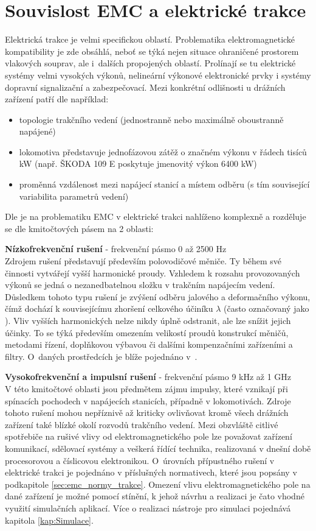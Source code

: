 \section{Souvislost EMC a elektrické trakce} \label{sec:emc_trakce}
Elektrická trakce je velmi specifickou oblastí. Problematika elektromagnetické kompatibility je zde obsáhlá, neboť se týká nejen situace ohraničené prostorem vlakových souprav, ale i~dalších propojených oblastí. Prolínají se tu elektrické systémy velmi vysokých výkonů, nelineární výkonové elektronické prvky i systémy dopravní signalizační a zabezpečovací. Mezi konkrétní odlišnosti u drážních zařízení patří dle \cite{nfr} například:
\begin{itemize}
\item topologie trakčního vedení (jednostranně nebo maximálně oboustranně napájené)
\item lokomotiva představuje jednofázovou zátěž o značném výkonu v řádech tisíců kW (např. ŠKODA 109 E poskytuje jmenovitý výkon 6400 kW)
\item proměnná vzdálenost mezi napájecí stanicí a místem odběru (s tím související variabilita parametrů vedení)
\end{itemize}
Dle \cite{emc_trakce} je na problematiku EMC v elektrické trakci nahlíženo komplexně a rozděluje se dle kmitočtových pásem na 2 oblasti:

\medskip
{\bf Nízkofrekvenční rušení} - frekvenční pásmo 0 až 2500 Hz \\
Zdrojem rušení představují především polovodičové měniče. Ty během své činnosti vytvářejí vyšší harmonické proudy. Vzhledem k rozsahu provozovaných výkonů se jedná o nezanedbatelnou složku v trakčním napájecím vedení. Důsledkem tohoto typu rušení je zvýšení odběru jalového a deformačního výkonu, čímž dochází k souvisejícímu zhoršení celkového účiníku $\lambda$ (často označovaný jako ). Vliv vyšších harmonických nelze nikdy úplně odstranit, ale lze snížit jejich účinky. To se týká především omezením velikostí proudů konstrukcí měničů, metodami řízení, doplňkovou výbavou či dalšími kompenzačními zařízeními a filtry. O~daných prostředcích je blíže pojednáno v~\cite{nfr}.

\medskip
{\bf Vysokofrekvenční a impulsní rušení} - frekvenční pásmo 9 kHz až 1 GHz \\
V této kmitočtové oblasti jsou předmětem zájmu impulsy, které vznikají při spínacích pochodech v napájecích stanicích, případně v lokomotivách. Zdroje tohoto rušení mohou nepříznivě až kriticky ovlivňovat kromě všech drážních zařízení také blízké okolí rozvodů trakčního vedení. Mezi obzvláště citlivé spotřebiče na rušivé vlivy od elektromagnetického pole lze považovat zařízení komunikací, sdělovací systémy a veškerá řídící technika, realizovaná v dnešní době procesorovou a číslicovou elektronikou. O~úrovních přípustného rušení v elektrické trakci je pojednáno v příslušných normativech, které jsou popsány v podkapitole \ref{sec:emc_normy_trakce}. Omezení vlivu elektromagnetického pole na dané zařízení je možné pomocí stínění, k jehož návrhu a realizaci je čato vhodné využití simulačních aplikací. Více o realizaci nástroje pro simulaci pojednává kapitola \ref{kap:Simulace}.
\newpage

